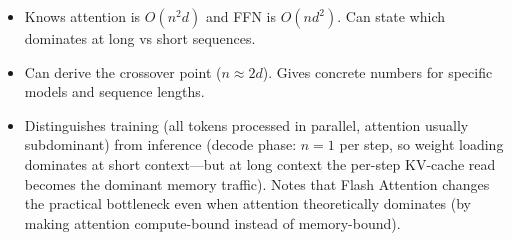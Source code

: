 \begin{interviewq}

\goodgreat
\begin{itemize}
    \item {} Knows attention is $O(n^2 d)$ and FFN is $O(nd^2)$. Can state which dominates at long vs short sequences.
    \item {} Can derive the crossover point ($n \approx 2d$). Gives concrete numbers for specific models and sequence lengths.
    \item {} Distinguishes training (all tokens processed in parallel, attention usually subdominant) from inference (decode phase: $n=1$ per step, so weight loading dominates at short context---but at long context the per-step KV-cache read becomes the dominant memory traffic). Notes that Flash Attention changes the practical bottleneck even when attention theoretically dominates (by making attention compute-bound instead of memory-bound).
\end{itemize}

\end{interviewq}

